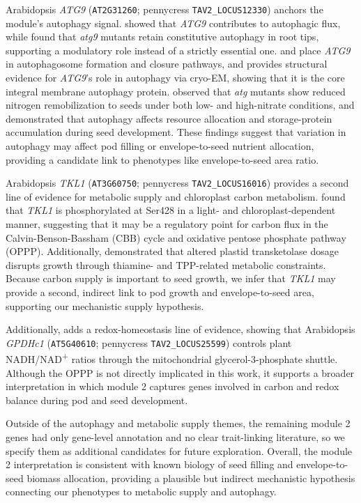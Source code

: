 Arabidopsis \textit{ATG9} (\texttt{AT2G31260}; pennycress \texttt{TAV2\_LOCUS12330}) anchors the module's autophagy signal. \cite{shin2014} showed that \textit{ATG9} contributes to autophagic flux, while \cite{inoue2006} found that \textit{atg9} mutants retain constitutive autophagy in root tips, supporting a modulatory role instead of a strictly essential one. \cite{kang2018} and \cite{luo2023} place \textit{ATG9} in autophagosome formation and closure pathways, and \cite{lai2020} provides structural evidence for \textit{ATG9}'s role in autophagy via cryo-EM, showing that it is the core integral membrane autophagy protein. \cite{guiboileau2012} observed that \textit{atg} mutants show reduced nitrogen remobilization to seeds under both low- and high-nitrate conditions, and \cite{diberardino2018} demonstrated that autophagy affects resource allocation and storage-protein accumulation during seed development. These findings suggest that variation in autophagy may affect pod filling or envelope-to-seed nutrient allocation, providing a candidate link to phenotypes like envelope-to-seed area ratio.

Arabidopsis \textit{TKL1} (\texttt{AT3G60750}; pennycress \texttt{TAV2\_LOCUS16016}) provides a second line of evidence for metabolic supply and chloroplast carbon metabolism. \cite{rocha2014} found that \textit{TKL1} is phosphorylated at Ser428 in a light- and chloroplast-dependent manner, suggesting that it may be a regulatory point for carbon flux in the Calvin-Benson-Bassham (CBB) cycle and oxidative pentose phosphate pathway (OPPP). Additionally, \cite{khozaei2015} demonstrated that altered plastid transketolase dosage disrupts growth through thiamine- and TPP-related metabolic constraints. Because carbon supply is important to seed growth, we infer that \textit{TKL1} may provide a second, indirect link to pod growth and envelope-to-seed area, supporting our mechanistic supply hypothesis.

Additionally, \cite{shen2006} adds a redox-homeostasis line of evidence, showing that Arabidopsis \textit{GPDHc1} (\texttt{AT5G40610}; pennycress \texttt{TAV2\_LOCUS25599}) controls plant NADH/NAD\textsuperscript{+} ratios through the mitochondrial glycerol-3-phosphate shuttle. Although the OPPP is not directly implicated in this work, it supports a broader interpretation in which module 2 captures genes involved in carbon and redox balance during pod and seed development.

Outside of the autophagy and metabolic supply themes, the remaining module 2 genes had only gene-level annotation and no clear trait-linking literature, so we specify them as additional candidates for future exploration. Overall, the module 2 interpretation is consistent with known biology of seed filling and envelope-to-seed biomass allocation, providing a plausible but indirect mechanistic hypothesis connecting our phenotypes to metabolic supply and autophagy.

